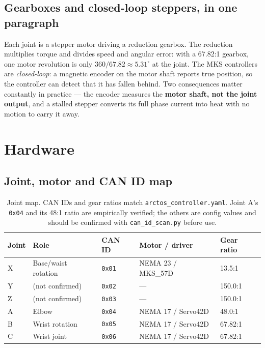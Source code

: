 \documentclass[11pt,letterpaper]{article}
\begin{document}
\subsection{Gearboxes and closed-loop steppers, in one paragraph}
Each joint is a stepper motor driving a reduction gearbox. The reduction multiplies
torque and divides speed and angular error: with a 67.82:1 gearbox, one motor
revolution is only $360/67.82 \approx 5.31^\circ$ at the joint. The MKS controllers
are \emph{closed-loop}: a magnetic encoder on the motor shaft reports true position,
so the controller can detect that it has fallen behind. Two consequences matter
constantly in practice --- the encoder measures the \textbf{motor shaft, not the
joint output}, and a stalled stepper converts its full phase current into heat with
no motion to carry it away.

\section{Hardware}

\subsection{Joint, motor and CAN ID map}
\begin{table}[h]
\centering
\begin{tabular}{lllll}
\toprule
\textbf{Joint} & \textbf{Role} & \textbf{CAN ID} & \textbf{Motor / driver} & \textbf{Gear ratio} \\ \midrule
X & Base/waist rotation & \texttt{0x01} & NEMA 23 / MKS\_57D    & 13.5:1  \\
Y & (not confirmed)     & \texttt{0x02} & ---                   & 150.0:1 \\
Z & (not confirmed)     & \texttt{0x03} & ---                   & 150.0:1 \\
A & Elbow               & \texttt{0x04} & NEMA 17 / Servo42D    & 48.0:1  \\
B & Wrist rotation      & \texttt{0x05} & NEMA 17 / Servo42D    & 67.82:1 \\
C & Wrist joint         & \texttt{0x06} & NEMA 17 / Servo42D    & 67.82:1 \\
\bottomrule
\end{tabular}
\caption{Joint map. CAN IDs and gear ratios match \texttt{arctos\_controller.yaml}.
Joint A's \texttt{0x04} and its 48:1 ratio are empirically verified; the others are
config values and should be confirmed with \texttt{can\_id\_scan.py} before use.}
\end{table}
\end{document}
